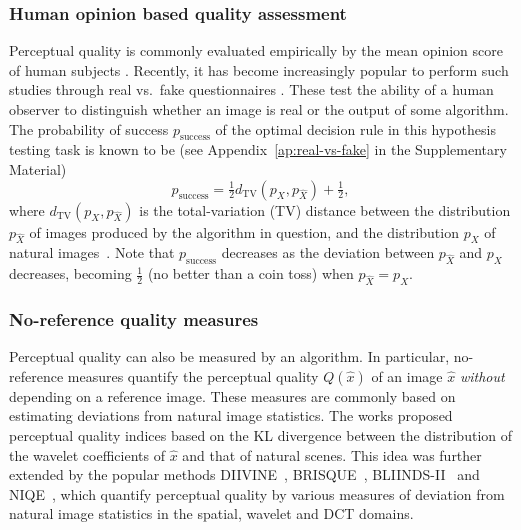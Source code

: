 \subsubsection*{Human opinion based quality assessment}
Perceptual quality is commonly evaluated empirically by the mean opinion score of human subjects \cite{moorthy2011blind,mittal2012no}. Recently, it has become increasingly popular to perform such studies through real vs.~fake questionnaires \cite{isola2016image,zhang2016colorful,salimans2016improved,denton2015deep,dahl2017pixel,iizuka2016let,zhang2017real,guadarrama2017pixcolor}. These test the ability of a human observer to distinguish whether an image is real or the output of some algorithm. The probability of success $p_{\text{success}}$ of the optimal decision rule in this hypothesis testing task is known to be (see Appendix~\ref{ap:real-vs-fake} in the Supplementary Material)
\begin{equation}\label{eq:psuccess}
p_{\text{success}} = \tfrac{1}{2} d_{\text{TV}}(p_X,p_{\hat{X}}) + \tfrac{1}{2} ,
\end{equation}
where $d_{\text{TV}}(p_X,p_{\hat{X}})$ is the total-variation (TV) distance between the distribution $p_{\hat{X}}$ of images produced by the algorithm in question, and the distribution $p_X$ of natural images~\cite{nielsen2013hypothesis}. Note that $p_{\text{success}}$ decreases as the deviation between $p_{\hat{X}}$ and $p_X$ decreases, becoming $\tfrac{1}{2}$ (no better than a coin toss) when $p_{\hat{X}}=p_X$.

\subsubsection*{No-reference quality measures}
Perceptual quality can also be measured by an algorithm. In particular, no-reference measures quantify the perceptual quality $Q(\hat{x})$ of an image $\hat{x}$ \emph{without} depending on a reference image. These measures are commonly based on estimating deviations from natural image statistics. The works \cite{wang2005reduced,wang2006quality,li2009reduced} proposed perceptual quality indices based on the KL divergence between the distribution of the wavelet coefficients of $\hat{x}$ and that of natural scenes. This idea was further extended by the popular methods DIIVINE~\cite{moorthy2011blind}, BRISQUE~\cite{mittal2012no}, BLIINDS-II~\cite{saad2012blind} and NIQE~\cite{mittal2013making}, which quantify perceptual quality by various measures of deviation from natural image statistics in the spatial, wavelet and DCT domains.

